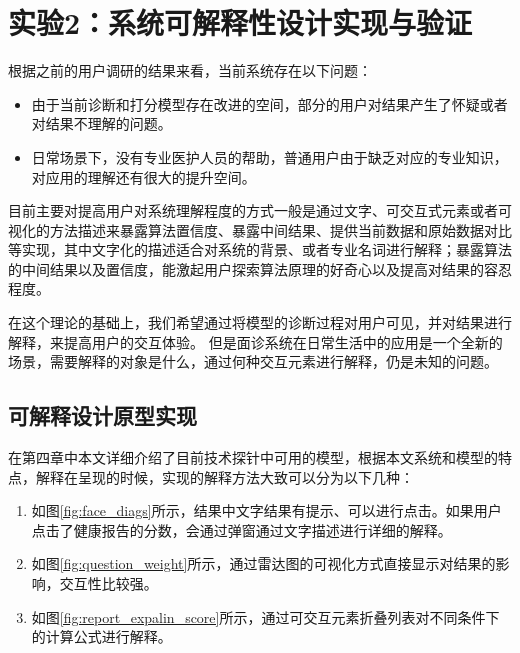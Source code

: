 \section{实验2：系统可解释性设计实现与验证}


根据之前的用户调研的结果来看，当前系统存在以下问题：

\begin{itemize}
    \item 由于当前诊断和打分模型存在改进的空间，部分的用户对结果产生了怀疑或者对结果不理解的问题。
    \item 日常场景下，没有专业医护人员的帮助，普通用户由于缺乏对应的专业知识，对应用的理解还有很大的提升空间。
\end{itemize}

目前主要对提高用户对系统理解程度的方式一般是通过文字、可交互式元素或者可视化的方法描述来暴露算法置信度、暴露中间结果、提供当前数据和原始数据对比等实现\cite{wang2019designing, kocielnik2019will}，其中文字化的描述适合对系统的背景、或者专业名词进行解释；暴露算法的中间结果以及置信度，能激起用户探索算法原理的好奇心以及提高对结果的容忍程度。

在这个理论的基础上，我们希望通过将模型的诊断过程对用户可见，并对结果进行解释，来提高用户的交互体验。
但是面诊系统在日常生活中的应用是一个全新的场景，需要解释的对象是什么，通过何种交互元素进行解释，仍是未知的问题。




\subsection{可解释设计原型实现}

在第四章中本文详细介绍了目前技术探针中可用的模型，根据本文系统和模型的特点，解释在呈现的时候，实现的解释方法大致可以分为以下几种：

\begin{enumerate}
    \item 如图\ref{fig:face_diags}所示，结果中文字结果有提示、可以进行点击。如果用户点击了健康报告的分数，会通过弹窗通过文字描述进行详细的解释。

    \item 如图\ref{fig:question_weight}所示，通过雷达图的可视化方式直接显示对结果的影响，交互性比较强。 
    
    \item 如图\ref{fig:report_expalin_score}所示，通过可交互元素折叠列表对不同条件下的计算公式进行解释。
\end{enumerate}

